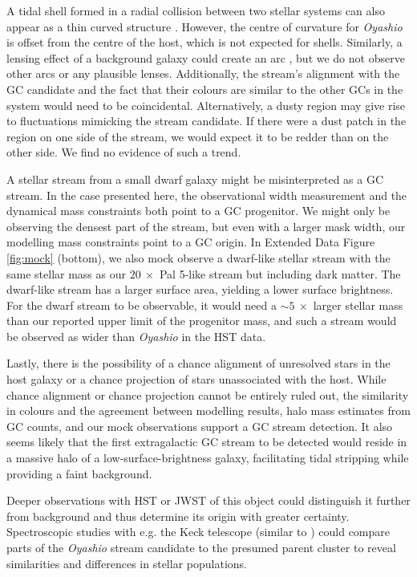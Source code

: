 \documentclass[pdflatex,sn-mathphys-num]{sn-jnl}
\theoremstyle{thmstyleone}
\theoremstyle{thmstyletwo}
\theoremstyle{thmstylethree}
\begin{document}
A tidal shell formed in a radial collision between two stellar systems can also appear as a thin curved structure \citep[e.g.,][]{Sanderson2013}. However, the centre of curvature for {\it Oyashio} is offset from the centre of the host, which is not expected for shells.
Similarly, a lensing effect of a background galaxy could create an arc \citep{Einstein1936, Cunha2018}, but we do not observe other arcs or any plausible lenses. Additionally, the stream's alignment with the GC candidate and the fact that their colours are similar to the other GCs in the system would need to be coincidental. Alternatively, a dusty region may give rise to fluctuations mimicking the stream candidate. If there were a dust patch in the region on one side of the stream, we would expect it to be redder than on the other side. We find no evidence of such a trend.

A stellar stream from a small dwarf galaxy might be misinterpreted as a GC stream.
In the case presented here, the observational width measurement and the dynamical mass constraints both point to a GC progenitor.
We might only be observing the densest part of the stream, but even with a larger mask width, our modelling mass constraints point to a GC origin.
In Extended Data Figure \ref{fig:mock} (bottom), we also mock observe a dwarf-like stellar stream with the same stellar mass as our $20~ \times$ Pal 5-like stream but including dark matter.
The dwarf-like stream has a larger surface area, yielding a lower surface brightness. For the dwarf stream to be observable, it would need a $\sim 5~ \times$ larger stellar mass than our reported upper limit of the progenitor mass, and such a stream would be observed as wider than {\it Oyashio} in the HST data.

Lastly, there is the possibility of a chance alignment of unresolved stars in the host galaxy or a chance projection of stars unassociated with the host.
While chance alignment or chance projection cannot be entirely ruled out, the similarity in colours and the agreement between modelling results, halo mass estimates from GC counts, and our mock observations support a GC stream detection.
It also seems likely that the first extragalactic GC stream to be detected would reside in a massive halo of a low-surface-brightness galaxy, facilitating tidal stripping while providing a faint background.

Deeper observations with HST or JWST of this object could distinguish it further from background and thus determine its origin with greater certainty. Spectroscopic studies with e.g. the Keck telescope (similar to \citep{Haacke2025, vanDokkum2016}) could compare parts of the \textit{Oyashio} stream candidate to the presumed parent cluster to reveal similarities and differences in stellar populations.
\end{document}

